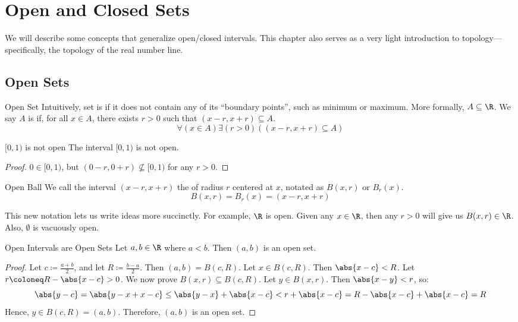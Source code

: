 \chapter{Open and Closed Sets}

We will describe some concepts that generalize open/closed intervals. This chapter also serves as a very light introduction to topology---specifically, the topology of the real number line.

\section{Open Sets}

\begin{dfnbox}{Open Set}{}
    Intuitively, set is  if it does not contain any of its ``boundary points'', such as minimum or maximum.
    \tcblower
    More formally,  $A \subseteq \R$. We say $A$ is  if, for all $x \in A$, there exists $r > 0$ such that $(x-r, x+r) \subseteq A$.
    \[ \forall(x \in A) \exists (r > 0) \left( (x-r, x+r) \subseteq A \right) \]
\end{dfnbox}


\begin{exbox}{$[0,1)$ is not open}{}
    The interval $[0,1)$ is not open.
    \tcblower
    \begin{proof}
        $0 \in [0,1)$, but $(0-r, 0+r) \not \subseteq [0,1)$ for any $r > 0$.
    \end{proof}
\end{exbox}

\begin{dfnbox}{Open Ball}{}
    We call the interval $(x-r, x+r)$ the  of radius $r$ centered at $x$, notated as $B(x,r)$ or $B_r(x)$.
    \tcblower
    \[ B(x,r) = B_r(x) = (x-r, x+r) \]
\end{dfnbox}

This new notation lets us write ideas more succinctly. For example, $\R$ is open. Given any $x \in \R$, then any $r > 0$ will give us $B(x, r) \in \R$. Also, $\emptyset$ is vacuously open.

\begin{lembox}{Open Intervals are Open Sets}{}
    Let $a,b \in \R$ where $a < b$. Then $(a,b)$ is an open set.
    \tcblower
    \begin{proof}
        Let $c \coloneq \frac{a+b}{2}$, and let $R \coloneq \frac{b-a}{2}$. Then $(a,b) = B(c, R)$. Let $x \in B(c, R)$. Then $\abs{x - c} < R$. Let $r \coloneq R - \abs{x - c} > 0$. We now prove $B(x,r) \subseteq B(c,R)$. Let $y \in B(x,r)$. Then $\abs{x-y} < r$, so:
        \[ \abs{y - c} = \abs{y-x+x-c} \leq \abs{y-x} + \abs{x-c} < r + \abs{x - c} = R - \abs{x-c} + \abs{x-c} = R \]
        Hence, $y \in B(c, R) = (a,b)$. Therefore, $(a,b)$ is an open set.
    \end{proof}
\end{lembox}

